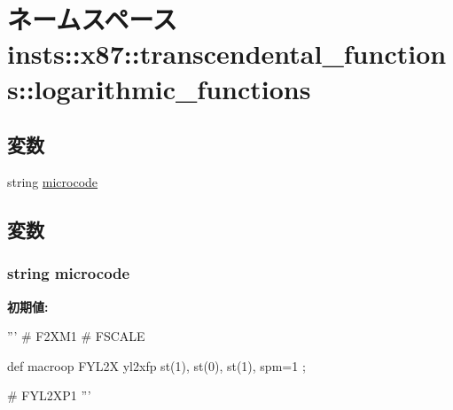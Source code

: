\hypertarget{namespaceinsts_1_1x87_1_1transcendental__functions_1_1logarithmic__functions}{
\section{ネームスペース insts::x87::transcendental\_\-functions::logarithmic\_\-functions}
\label{namespaceinsts_1_1x87_1_1transcendental__functions_1_1logarithmic__functions}
}
\subsection*{変数}
\begin{DoxyCompactItemize}
\item 
string \hyperlink{namespaceinsts_1_1x87_1_1transcendental__functions_1_1logarithmic__functions_a770f11a173e99389a8802f0107ed8f52}{microcode}
\end{DoxyCompactItemize}


\subsection{変数}
\hypertarget{namespaceinsts_1_1x87_1_1transcendental__functions_1_1logarithmic__functions_a770f11a173e99389a8802f0107ed8f52}{
\subsubsection[{microcode}]{\setlength{\rightskip}{0pt plus 5cm}string {\bf microcode}}}
\label{namespaceinsts_1_1x87_1_1transcendental__functions_1_1logarithmic__functions_a770f11a173e99389a8802f0107ed8f52}
{\bfseries 初期値:}
\begin{DoxyCode}
'''
# F2XM1
# FSCALE

def macroop FYL2X {
    yl2xfp st(1), st(0), st(1), spm=1
};

# FYL2XP1
'''
\end{DoxyCode}
